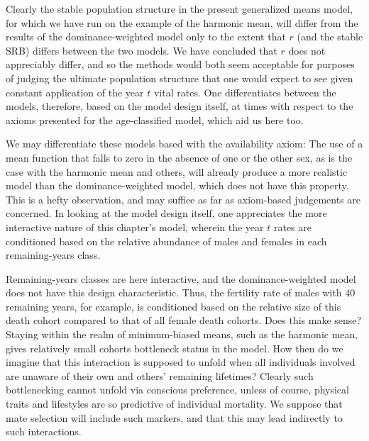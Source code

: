 \FloatBarrier

Clearly the stable population structure in the present generalized means model,
for which we have run on the example of the harmonic mean, will differ from
the results of the dominance-weighted model only to the extent that $r$ (and
the stable SRB) differs between the two models. We have concluded that $r$ does
not appreciably differ, and so the methods would both seem acceptable for
purposes of judging the ultimate population structure that one would expect to
see given constant application of the year $t$ vital rates. One differentiates
between the models, therefore, based on the model design itself, at times with
respect to the axioms presented for the age-classified model, which aid us here
too. 

We may differentiate these models based with the availability axiom:  The use of
a mean function that falls to zero in the absence of one or the other sex, as is the 
case with the harmonic mean and others, will already produce a more
realistic model than the dominance-weighted model, which does not have this
property. This is a hefty observation, and may suffice as far as axiom-based
judgements are concerned. In looking at the model design itself, one appreciates
the more interactive nature of this chapter's model, wherein the year $t$ rates
are conditioned based on the relative abundance of males and females in each
remaining-years class. 

Remaining-years classes are here interactive, and
the dominance-weighted model does not have this design characteristic. Thus, the
fertility rate of males with 40 remaining years, for example, is conditioned
based on the relative size of this death cohort compared to that of all female
death cohorts. Does this make sense? Staying within the realm of minimum-biased
means, such as the harmonic mean, gives relatively small cohorts
bottleneck status in the model. How then do we imagine that this interaction is
supposed to unfold when all individuals involved are unaware of their own and
others' remaining lifetimes? Clearly such bottlenecking cannot unfold
via conscious preference, unless of course, physical traits and lifestyles are
so predictive of individual mortality. We suppose that mate selection will
include such markers, and that this may lead indirectly to such interactions.

